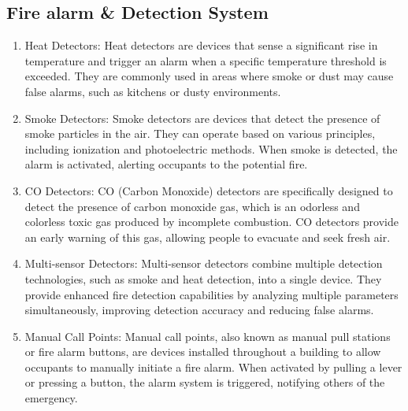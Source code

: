 \documentclass{article}
\begin{document}
\subsection*{Fire alarm \& Detection System}
\begin{enumerate}
  \item Heat Detectors: Heat detectors are devices that sense a significant rise in temperature and trigger an alarm when a specific temperature threshold is exceeded. They are commonly used in areas where smoke or dust may cause false alarms, such as kitchens or dusty environments.

  \item Smoke Detectors: Smoke detectors are devices that detect the presence of smoke particles in the air. They can operate based on various principles, including ionization and photoelectric methods. When smoke is detected, the alarm is activated, alerting occupants to the potential fire.
  
  \item CO Detectors: CO (Carbon Monoxide) detectors are specifically designed to detect the presence of carbon monoxide gas, which is an odorless and colorless toxic gas produced by incomplete combustion. CO detectors provide an early warning of this gas, allowing people to evacuate and seek fresh air.
  
  \item Multi-sensor Detectors: Multi-sensor detectors combine multiple detection technologies, such as smoke and heat detection, into a single device. They provide enhanced fire detection capabilities by analyzing multiple parameters simultaneously, improving detection accuracy and reducing false alarms.
  
  \item Manual Call Points: Manual call points, also known as manual pull stations or fire alarm buttons, are devices installed throughout a building to allow occupants to manually initiate a fire alarm. When activated by pulling a lever or pressing a button, the alarm system is triggered, notifying others of the emergency.
\end{enumerate}
\end{document}
